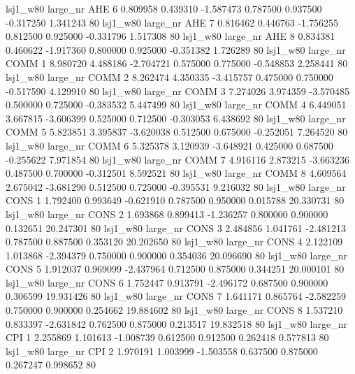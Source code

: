     lsj1_w80   large_nr      AHE                 6  0.809958  0.439310  -1.587473 0.787500 0.937500 -0.317250    1.341243 80
    lsj1_w80   large_nr      AHE                 7  0.816462  0.446763  -1.756255 0.812500 0.925000 -0.331796    1.517308 80
    lsj1_w80   large_nr      AHE                 8  0.834381  0.460622  -1.917360 0.800000 0.925000 -0.351382    1.726289 80
    lsj1_w80   large_nr     COMM                 1  8.980720  4.488186  -2.704721 0.575000 0.775000 -0.548853    2.258441 80
    lsj1_w80   large_nr     COMM                 2  8.262474  4.350335  -3.415757 0.475000 0.750000 -0.517590    4.129910 80
    lsj1_w80   large_nr     COMM                 3  7.274026  3.974359  -3.570485 0.500000 0.725000 -0.383532    5.447499 80
    lsj1_w80   large_nr     COMM                 4  6.449051  3.667815  -3.606399 0.525000 0.712500 -0.303053    6.438692 80
    lsj1_w80   large_nr     COMM                 5  5.823851  3.395837  -3.620038 0.512500 0.675000 -0.252051    7.264520 80
    lsj1_w80   large_nr     COMM                 6  5.325378  3.120939  -3.648921 0.425000 0.687500 -0.255622    7.971854 80
    lsj1_w80   large_nr     COMM                 7  4.916116  2.873215  -3.663236 0.487500 0.700000 -0.312501    8.592521 80
    lsj1_w80   large_nr     COMM                 8  4.609564  2.675042  -3.681290 0.512500 0.725000 -0.395531    9.216032 80
    lsj1_w80   large_nr     CONS                 1  1.792400  0.993649  -0.621910 0.787500 0.950000  0.015788   20.330731 80
    lsj1_w80   large_nr     CONS                 2  1.693868  0.899413  -1.236257 0.800000 0.900000  0.132651   20.247301 80
    lsj1_w80   large_nr     CONS                 3  2.484856  1.041761  -2.481213 0.787500 0.887500  0.353120   20.202650 80
    lsj1_w80   large_nr     CONS                 4  2.122109  1.013868  -2.394379 0.750000 0.900000  0.354036   20.096690 80
    lsj1_w80   large_nr     CONS                 5  1.912037  0.969099  -2.437964 0.712500 0.875000  0.344251   20.000101 80
    lsj1_w80   large_nr     CONS                 6  1.752447  0.913791  -2.496172 0.687500 0.900000  0.306599   19.931426 80
    lsj1_w80   large_nr     CONS                 7  1.641171  0.865764  -2.582259 0.750000 0.900000  0.254662   19.884602 80
    lsj1_w80   large_nr     CONS                 8  1.537210  0.833397  -2.631842 0.762500 0.875000  0.213517   19.832518 80
    lsj1_w80   large_nr      CPI                 1  2.255869  1.101613  -1.008739 0.612500 0.912500  0.262418    0.577813 80
    lsj1_w80   large_nr      CPI                 2  1.970191  1.003999  -1.503558 0.637500 0.875000  0.267247    0.998652 80
